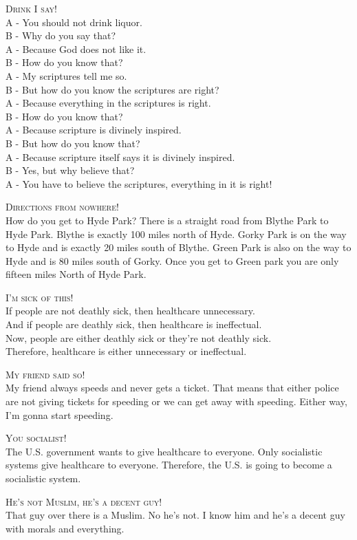 \documentclass{article}
\begin{document}
\begin{exe}
\ex \textsc{Drink I say!}\\
A - You should not drink liquor.\\
B - Why do you say that?\\
A - Because God does not like it.\\
B - How do you know that?\\
A - My scriptures tell me so.\\
B - But how do you know the scriptures are right?\\
A - Because everything in the scriptures is right.\\
B - How do you know that?\\
A - Because scripture is divinely inspired.\\
B - But how do you know that?\\
A - Because scripture itself says it is divinely inspired.\\
B - Yes, but why believe that?\\
A - You have to believe the scriptures, everything in it is right!

\ex \textsc{Directions from nowhere!}\\
How do you get to Hyde Park?
There is a straight road from Blythe Park to Hyde Park. Blythe is exactly 100 miles north of Hyde. Gorky Park is on the way to Hyde and is exactly 20 miles south of Blythe. Green Park is also on the way to Hyde and is 80 miles south of Gorky. Once you get to Green park you are only fifteen miles North of Hyde Park.

\ex \textsc{I'm sick of this!}\\
If people are not deathly sick, then healthcare unnecessary.\\
And if people are deathly sick, then healthcare is ineffectual.\\
Now, people are either deathly sick or they're not deathly sick.\\
Therefore, healthcare is either unnecessary or ineffectual. 

\ex \textsc{My friend said so!}\\
My friend always speeds and never gets a ticket. That means that either police are not giving tickets for speeding or we can get away with speeding. Either way, I'm gonna start speeding.

\ex \textsc{You socialist!}\\
The U.S. government wants to give healthcare to everyone. Only socialistic systems give healthcare to everyone. Therefore, the U.S. is going to become a socialistic system.

\ex \textsc{He's not Muslim, he's a decent guy!}\\
That guy over there is a Muslim. No he's not. I know him and he's a decent guy with morals and everything.
\end{exe}
\end{document}
